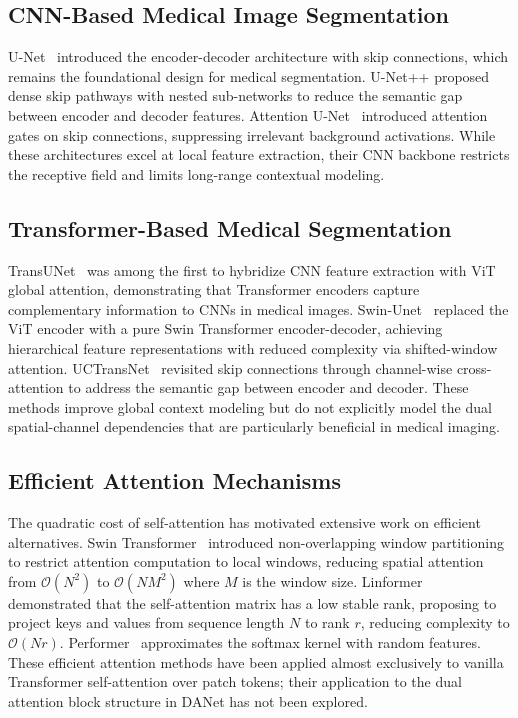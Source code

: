 \documentclass[conference]{IEEEtran}
\begin{document}
\subsection{CNN-Based Medical Image Segmentation}

U-Net~\cite{ronneberger2015unet} introduced the encoder-decoder architecture with skip connections, which remains the foundational design for medical segmentation. U-Net++ \cite{zhou2018unetpp} proposed dense skip pathways with nested sub-networks to reduce the semantic gap between encoder and decoder features. Attention U-Net~\cite{oktay2018attention} introduced attention gates on skip connections, suppressing irrelevant background activations. While these architectures excel at local feature extraction, their CNN backbone restricts the receptive field and limits long-range contextual modeling.

\subsection{Transformer-Based Medical Segmentation}

TransUNet~\cite{chen2021transunet} was among the first to hybridize CNN feature extraction with ViT global attention, demonstrating that Transformer encoders capture complementary information to CNNs in medical images. Swin-Unet~\cite{cao2022swinunet} replaced the ViT encoder with a pure Swin Transformer encoder-decoder, achieving hierarchical feature representations with reduced complexity via shifted-window attention. UCTransNet~\cite{wang2022uctransnet} revisited skip connections through channel-wise cross-attention to address the semantic gap between encoder and decoder. These methods improve global context modeling but do not explicitly model the dual spatial-channel dependencies that are particularly beneficial in medical imaging.

\subsection{Efficient Attention Mechanisms}

The quadratic cost of self-attention has motivated extensive work on efficient alternatives. Swin Transformer~\cite{liu2021swin} introduced non-overlapping window partitioning to restrict attention computation to local windows, reducing spatial attention from $\mathcal{O}(N^2)$ to $\mathcal{O}(N M^2)$ where $M$ is the window size. Linformer~\cite{wang2020linformer} demonstrated that the self-attention matrix has a low stable rank, proposing to project keys and values from sequence length $N$ to rank $r$, reducing complexity to $\mathcal{O}(Nr)$. Performer~\cite{choromanski2020performer} approximates the softmax kernel with random features. These efficient attention methods have been applied almost exclusively to vanilla Transformer self-attention over patch tokens; their application to the dual attention block structure in DANet has not been explored.
\end{document}
